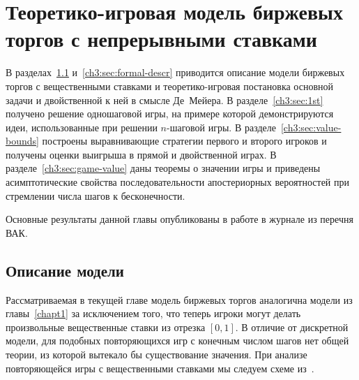 \chapter{Теоретико-игровая модель биржевых торгов с непрерывными ставками} \label{chapt3}%
{
\newcommand{\Port}[1]{\ensuremath{\pi_{#1}}}
\newcommand*\dualFPS{\ensuremath{(p,\ \sigma)}}
\dualg[4][1=n, 2={\dualFPS}, 3=z, 4=\tau]{\ensuremath{g^*_{#1}({#3}, {#2}, {#4})}}


В разделах~\ref{ch3:sec:model-descr} и~\ref{ch3:sec:formal-descr} приводится описание модели биржевых торгов с вещественными ставками и теоретико-игровая постановка основной задачи и двойственной к ней в смысле Де~Мейера.
В разделе~\ref{ch3:sec:1st} получено решение одношаговой игры, на примере которой демонстрируются идеи, использованные при решении $n$-шаговой игры.
В разделе~\ref{ch3:sec:value-bounds} построены выравнивающие стратегии первого и второго игроков и получены оценки выигрыша в прямой и двойственной играх.
В разделе~\ref{ch3:sec:game-value} даны теоремы о значении игры и приведены асимптотические свойства последовательности апостериорных вероятностей при стремлении числа шагов к бесконечности.

Основные результаты данной главы опубликованы в работе \cite{pyanykh16:cont} в журнале из перечня ВАК.

\section{Описание модели}
\label{ch3:sec:model-descr}

Рассматриваемая в текущей главе модель биржевых торгов аналогична модели из главы~\ref{chapt1} за исключением того, что теперь игроки могут делать произвольные вещественные ставки из отрезка $[0, 1]$.
В отличие от дискретной модели, для подобных повторяющихся игр с конечным числом шагов нет общей теории, из которой вытекало бы существование значения.
При анализе повторяющейся игры с вещественными ставками мы следуем схеме из~\cite{demeyer02c}.

}
